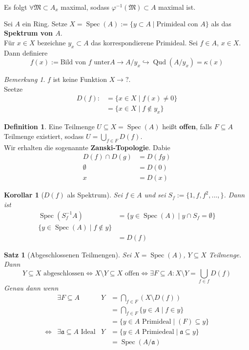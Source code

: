 \documentclass[10pt,a4paper]{article}
\newcommand{\Qud}{\operatorname{Qud}}
\newcommand{\Spec}{\ensuremath{\operatorname{Spec}}}
\newcounter{thm}[section]
\theoremstyle{definition}
\newtheorem{definition}[thm]{Definition}
\theoremstyle{plain}
\newtheorem{kor}[thm]{Korollar}
\newtheorem{satz}[thm]{Satz}
\theoremstyle{remark}
\newtheorem{bem}[thm]{Bemerkung}
\begin{document}
Es folgt $\forall \mathfrak M\subset A_x$ maximal, sodass $\varphi^{-1}(\mathfrak M)\subset A$ maximal ist.\\
\begin{def}
	\label{satz414}
	Sei $A$ ein Ring. Setze $X=\Spec(A):=\{y\subset A\mid\text{Primideal con $A$}\}$ als das \textbf{Spektrum von $A$}.\\
	Für $x\in X$ bezeichne $y_x\subset A$ das korrespondierene Primideal.
	Sei $f\in A$, $x\in X$. Dann definiere
	\[f(x):=\text{Bild von $f$ unter}A\rightarrow A/y_x\hookrightarrow\Qud(A/y_x)=\kappa(x)\]
\end{def}
\begin{bem}
	$f$ ist keine Funktion $X\rightarrow ?$.\\
	Seetze
	\begin{align*}
	D(f):&=\{x\in X\mid f(x)\neq 0\}\\
	&=\{x\in X\mid f\notin y_x\}
	\end{align*}
\end{bem}
\begin{definition}
	Eine Teilmenge $U\subseteq X=\Spec(A)$ heißt \textbf{offen}, falls $F\subseteq A$ Teilmenge existiert, sodass $U=\bigcup_{f\in F}D(f)$.\\
	Wir erhalten die sogenannte \textbf{Zanski-Topologie}.
	Dabie
	\begin{align*}
	D(f)\cap D(g)&=D(fg)\\
	\emptyset&=D(0)\\
	x&=D(x)
	\end{align*} 
\end{definition}
\begin{kor}[$D(f)$ als Spektrum]
	Sei $f\in A$ und sei $S_f:=\{1,f,f^2,...,\}$. Dann ist\begin{align*}
	\Spec(S^{-1}_fA)&=\{y\in\Spec(A)\mid y\cap S_f=\emptyset\}\\
	\{y\in\Spec(A)\mid f\notin y\}\\
	&=D(f)
	\end{align*}
\end{kor}
\begin{satz}[Abgeschlossenen Teilmengen]
	Sei $X=\Spec(A)$, $Y\subseteq X$ Teilmenge. Dann
	\[\text{$Y\subseteq X$ abgeschlossen}
	\Leftrightarrow \text{$X\setminus Y\subseteq X$ offen}
	\Leftrightarrow \exists F\subseteq A:X\setminus Y=\bigcup_{f\in f}D(f)\]
	Genau dann wenn
	\begin{align*}
	&\exists F\subseteq A&Y&=\bigcap_{f\in F}(X\setminus D(f))\\
	&&&=\bigcap_{f\in F}\{y\in A\mid f\in y\}\\
	&&&=\{y\in A\text{ Primideal}\mid(F)\subseteq y\}\\
	\Leftrightarrow&\exists\mathfrak a\subseteq A\text{ Ideal}&Y&=\{y\in A\text{ Primiedeal}\mid\mathfrak a\subseteq y\}\\
	&&&=\Spec(A/\mathfrak a)
	\end{align*}
\end{satz}
\end{document}
